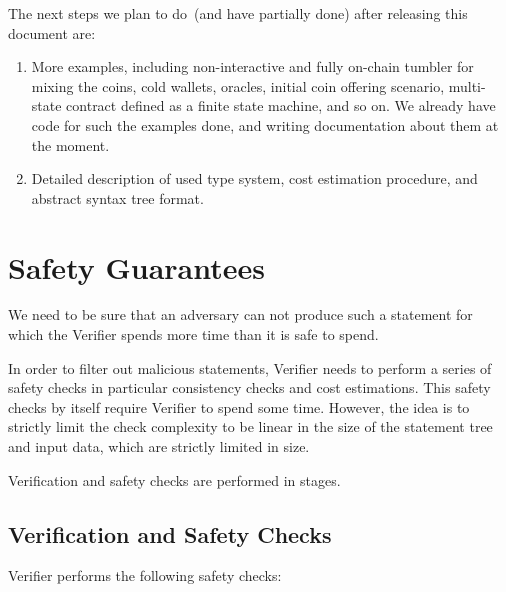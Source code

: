 \documentclass[11pt]{article}
\begin{document}
The next steps we plan to do~(and have partially done) after releasing this document are:
    \begin{enumerate}
        \item{} More examples, including non-interactive and fully on-chain tumbler for mixing the coins, cold wallets,
        oracles, initial coin offering scenario, multi-state contract defined as a finite state machine, and so on. We
        already have code for such the examples done, and writing documentation about them at the moment.
        \item{} Detailed description of used type system, cost estimation procedure, and abstract syntax tree format.
    \end{enumerate}





\appendix


\section{Safety Guarantees}
\label{app:safety}

We need to be sure that an adversary can not produce such a statement for
which the Verifier spends more time than it is safe to spend.

In order to filter out malicious statements, Verifier needs to perform a
series of safety checks in particular consistency checks and cost
estimations. This safety checks by itself require Verifier to spend some
time. However, the idea is to strictly limit the check complexity to be
linear in the size of the statement tree and input data, which are strictly
limited in size.

Verification and safety checks are performed in stages.

\subsection{Verification and Safety Checks}
\label{sec:safety-checks}

Verifier performs the following safety checks:
\end{document}
